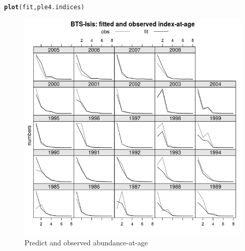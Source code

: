\documentclass[a4paper,english,10pt]{article}\usepackage[]{graphicx}\usepackage[]{color}
\makeatletter
\def\maxwidth{ %
  \ifdim\Gin@nat@width>\linewidth
    \linewidth
  \else
    \Gin@nat@width
  \fi
}
\newcommand{\hlstd}[1]{\textcolor[rgb]{0.345,0.345,0.345}{#1}}%
\newcommand{\hlkwd}[1]{\textcolor[rgb]{0.737,0.353,0.396}{\textbf{#1}}}%
\newenvironment{kframe}{%
 \def\at@end@of@kframe{}%
 \ifinner\ifhmode%
  \def\at@end@of@kframe{\end{minipage}}%
  \begin{minipage}{\columnwidth}%
 \fi\fi%
 \def\FrameCommand##1{\hskip\@totalleftmargin \hskip-\fboxsep
 \colorbox{shadecolor}{##1}\hskip-\fboxsep
     \hskip-\linewidth \hskip-\@totalleftmargin \hskip\columnwidth}%
 \MakeFramed {\advance\hsize-\width
   \@totalleftmargin\z@ \linewidth\hsize
   \@setminipage}}%
 {\par\unskip\endMakeFramed%
 \at@end@of@kframe}
\newenvironment{knitrout}{}{} %
\makeatother
\begin{document}
\begin{knitrout}
\color{fgcolor}\begin{kframe}
\begin{alltt}
\hlkwd{plot}\hlstd{(fit, ple4.indices)}
\end{alltt}
\end{kframe}\begin{figure}[H]

{\centering \includegraphics[width=\maxwidth]{figure/idxplt-1} 

}

\caption[Predict and observed abundance-at-age]{Predict and observed abundance-at-age}\label{fig:idxplt1}
\end{figure}

\begin{figure}[H]


\end{figure}
\end{knitrout}
\end{document}
